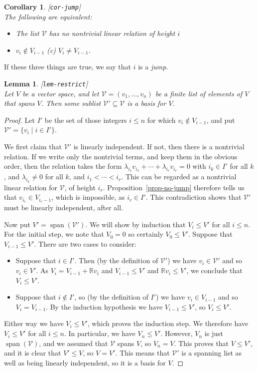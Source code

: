 \documentclass{amsart}
\newcommand{\lbl}[1]{\label{#1}\textup{[\texttt{#1}]}\ \\}
\newcommand{\lbl}{\label}
\newcommand{\R}         {{\mathbb{R}}}
\newcommand{\spn}       {\operatorname{span}}
\newcommand{\lm}        {\lambda}
\newcommand{\sse}       {\subseteq}
\newcommand{\st}        {\;|\;}
\newcommand{\CV}        {{\mathcal{V}}}
\renewcommand{\:}       {\colon}
\newtheorem{lemma}[theorem]{Lemma}
\newtheorem{corollary}[theorem]{Corollary}
\theoremstyle{definition}
\begin{document}
\begin{corollary}\lbl{cor-jump}
 The following are equivalent:
 \begin{itemize}
  \item[(a)] The list $\CV$ has no nontrivial linear relation
   of height $i$
  \item[(b)] $v_i\not\in V_{i-1}$  \hspace{5em} (c) $V_i\neq V_{i-1}$. 
 \end{itemize}
\end{corollary}
If these three things are true, we say that $i$ is a \emph{jump}.

\begin{lemma}\lbl{lem-restrict}
 Let $V$ be a vector space, and let $\CV=(v_1,\dotsc,v_n)$
 be a finite list of elements of $V$ that spans $V$.  Then
 some sublist $\CV'\sse\CV$ is a basis for $V$.
\end{lemma}
\begin{proof}
 Let $I'$ be the set of those integers $i\leq n$ for which
 $v_i\not\in V_{i-1}$, and put $\CV'=\{v_i\st i\in I'\}$.

 We first claim that $\CV'$ is linearly independent.  If
 not, then there is a nontrivial relation.  If we write only
 the nontrivial terms, and keep them in the obvious order,
 then the relation takes the form 
 $\lm_{i_1}v_{i_1}+\dotsb+\lm_{i_r}v_{i_r}=0$ with
 $i_k\in I'$ for all $k$, and $\lm_{i_k}\neq 0$ for all $k$,
 and $i_1<\dotsb<i_r$.  This can be regarded as a nontrivial
 linear relation for $\CV$, of height $i_r$.
 Proposition~\ref{prop-no-jump} therefore tells us that
 $v_{i_r}\in V_{i_r-1}$, which is impossible, as
 $i_r\in I'$.  This contradiction shows that $\CV'$ must be
 linearly independent, after all.

 Now put $V'=\spn(\CV')$.  We will show by induction that
 $V_i\leq V'$ for all $i\leq n$.  For the initial step, we
 note that $V_0=0$ so certainly $V_0\leq V'$.  Suppose that
 $V_{i-1}\leq V'$.  There are two cases to consider:
 \begin{itemize}
  \item[(a)] Suppose that $i\in I'$.  Then (by the
   definition of $\CV'$) we have $v_i\in\CV'$ and so
   $v_i\in V'$.  As $V_i=V_{i-1}+\R v_i$ and
   $V_{i-1}\leq V'$ and $\R v_i\leq V'$, we conclude that
   $V_i\leq V'$.
  \item[(b)] Suppose that $i\not\in I'$, so (by the
   definition of $I'$) we have $v_i\in V_{i-1}$ and so
   $V_i=V_{i-1}$.  By the induction hypothesis we have
   $V_{i-1}\leq V'$, so $V_i\leq V'$.
 \end{itemize}
 Either way we have $V_i\leq V'$, which proves the induction
 step.  We therefore have $V_i\leq V'$ for all $i\leq n$.
 In particular, we have $V_n\leq V'$.  However, $V_n$ is
 just $\spn(\CV)$, and we assumed that $\CV$ spans $V$, so
 $V_n=V$.  This proves that $V\leq V'$, and it is clear that
 $V'\leq V$, so $V=V'$.  This means that $\CV'$ is a
 spanning list as well as being linearly independent, so it
 is a basis for $V$.
\end{proof}
\end{document}

